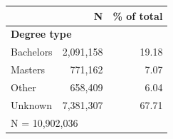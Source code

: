 \begin{tabular}{lrr}


\toprule


 & N & \% of total \\


\midrule


\multicolumn{3}{l}{\textbf{Degree type}}\\ 
\midrule
Bachelors           &   2,091,158&       19.18\\
Masters             &     771,162&        7.07\\
Other               &     658,409&        6.04\\
Unknown             &   7,381,307&       67.71\\
\midrule


\multicolumn{3}{l}{\footnotesize N =   10,902,036}\\


\bottomrule


\end{tabular}


